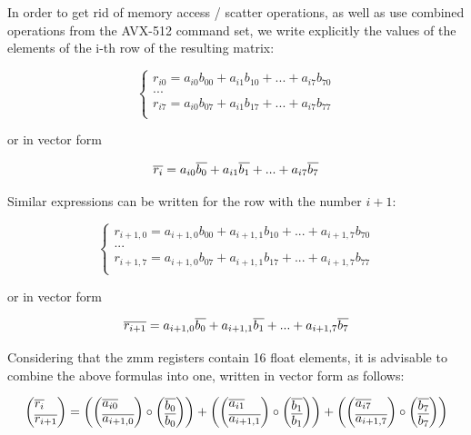 \documentclass[
11pt,%
tightenlines,%
twoside,%
onecolumn,%
nofloats,%
nobibnotes,%
nofootinbib,%
superscriptaddress,%
noshowpacs,%
centertags]%
{revtex4}
\begin{document}
In order to get rid of memory access / scatter operations, as well as use combined operations from the AVX-512 command set, we write explicitly the values of the elements of the i-th row of the resulting matrix:

\begin{equation}
\begin{cases}
r_{i0} = a_{i0}b_{00} + a_{i1}b_{10} + ... + a_{i7}b_{70} \\
... \\
r_{i7} = a_{i0}b_{07} + a_{i1}b_{17} + ... + a_{i7}b_{77} \\
\end{cases}
\end{equation}

or in vector form

\begin{equation}
\overline{r_i} = a_{i0}\overline{b_0} + a_{i1}\overline{b_1} + ... + a_{i7}\overline{b_7} \\
\end{equation}

Similar expressions can be written for the row with the number $i + 1$:

\begin{equation}
\begin{cases}
r_{i+1,0} = a_{i+1,0}b_{00} + a_{i+1,1}b_{10} + ... + a_{i+1,7}b_{70} \\
... \\
r_{i+1,7} = a_{i+1,0}b_{07} + a_{i+1,1}b_{17} + ... + a_{i+1,7}b_{77} \\
\end{cases}
\end{equation}

or in vector form

\begin{equation}
\overline{r_{i+1}} = a_{i+1,0}\overline{b_0} + a_{i+1,1}\overline{b_1} + ... + a_{i+1,7}\overline{b_7} \\
\end{equation}

Considering that the zmm registers contain 16 float elements, it is advisable to combine the above formulas into one, written in vector form as follows:

\begin{equation}
\left(\vcenter{\hbox{$\overline{r_i}$}\hbox{$\overline{r_{i+1}}$}}\right) =
\left(
\left(\vcenter{\hbox{$\overline{a_{i0}}$}\hbox{$\overline{a_{i+1,0}}$}}\right) \circ
\left(\vcenter{\hbox{$\overline{b_0}$}\hbox{$\overline{b_0}$}}\right)
\right) +
\left(
\left(\vcenter{\hbox{$\overline{a_{i1}}$}\hbox{$\overline{a_{i+1,1}}$}}\right) \circ
\left(\vcenter{\hbox{$\overline{b_1}$}\hbox{$\overline{b_1}$}}\right)
\right) +
\left(
\left(\vcenter{\hbox{$\overline{a_{i7}}$}\hbox{$\overline{a_{i+1,7}}$}}\right) \circ
\left(\vcenter{\hbox{$\overline{b_7}$}\hbox{$\overline{b_7}$}}\right)
\right)
\end{equation}
\end{document}

